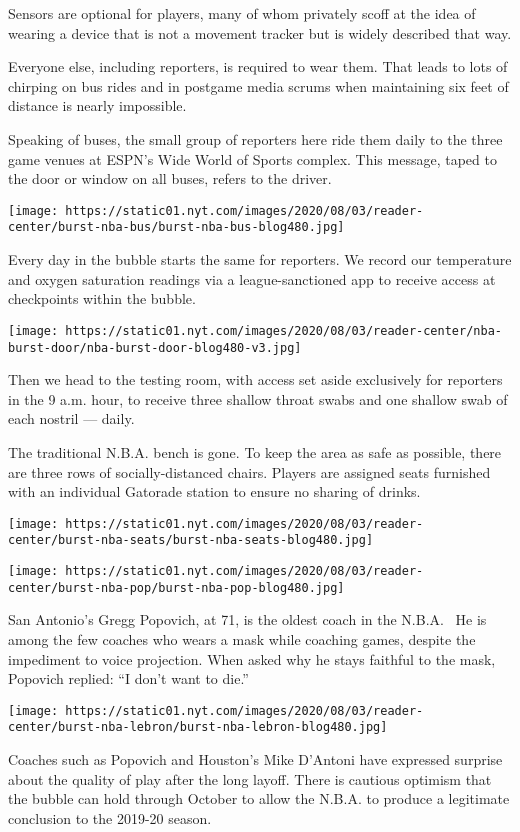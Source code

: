 Sensors are optional for players, many of whom privately scoff at the
idea of wearing a device that is not a movement tracker but is widely
described that way.

 Everyone else, including reporters, is required to wear them. That
leads to lots of chirping on bus rides and in postgame media scrums when
maintaining six feet of distance is nearly impossible.~

Speaking of buses, the small group of reporters here ride them daily to
the three game venues at ESPN's Wide World of Sports complex. This
message, taped to the door or window on all buses, refers to the driver.

\texttt{[image: https://static01.nyt.com/images/2020/08/03/reader-center/burst-nba-bus/burst-nba-bus-blog480.jpg]}

Every day in the bubble starts the same for reporters. We record our
temperature and oxygen saturation readings via a league-sanctioned app
to receive access at checkpoints within the bubble.

\texttt{[image: https://static01.nyt.com/images/2020/08/03/reader-center/nba-burst-door/nba-burst-door-blog480-v3.jpg]}

Then we head to the testing room, with access set aside exclusively for
reporters in the 9 a.m. hour, to receive three shallow throat swabs and
one shallow swab of each nostril --- daily.

The traditional N.B.A. bench is gone. To keep the area as safe as
possible, there are three rows of socially-distanced chairs. Players are
assigned seats furnished with an individual Gatorade station to ensure
no sharing of drinks.

\texttt{[image: https://static01.nyt.com/images/2020/08/03/reader-center/burst-nba-seats/burst-nba-seats-blog480.jpg]}

\texttt{[image: https://static01.nyt.com/images/2020/08/03/reader-center/burst-nba-pop/burst-nba-pop-blog480.jpg]}

San Antonio's Gregg Popovich, at 71, is the oldest coach in the N.B.A.~
He is among the few coaches who wears a mask while coaching games,
despite the impediment to voice projection. When asked why he stays
faithful to the mask, Popovich replied: ``I don't want to die.''

\texttt{[image: https://static01.nyt.com/images/2020/08/03/reader-center/burst-nba-lebron/burst-nba-lebron-blog480.jpg]}

Coaches such as Popovich and Houston's Mike D'Antoni have expressed
surprise about the quality of play after the long layoff. There is
cautious optimism that the bubble can hold through October to allow the
N.B.A. to produce a legitimate conclusion to the 2019-20 season.

